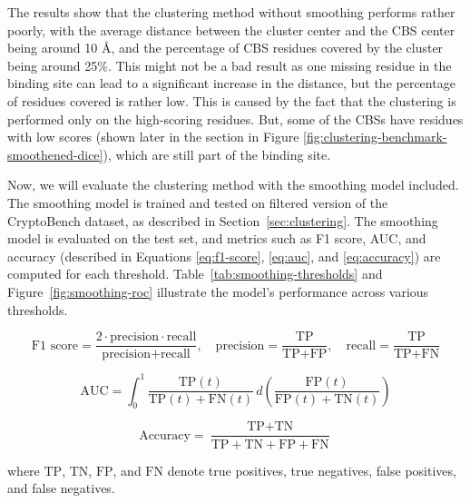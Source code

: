 The results show that the clustering method without smoothing performs rather poorly, with the average distance between the cluster center and the CBS center being around 10 \AA, and the percentage of CBS residues covered by the cluster being around 25\%. This might not be a bad result as one missing residue in the binding site can lead to a significant increase in the distance, but the percentage of residues covered is rather low. This is caused by the fact that the clustering is performed only on the high-scoring residues. But, some of the CBSs have residues with low scores (shown later in the section in Figure \ref{fig:clustering-benchmark-smoothened-dice}), which are still part of the binding site.

Now, we will evaluate the clustering method with the smoothing model included. The smoothing model is trained and tested on filtered version of the CryptoBench dataset, as described in Section~\ref{sec:clustering}. The smoothing model is evaluated on the test set, and metrics such as F1 score, AUC, and accuracy (described in Equations \ref{eq:f1-score}, \ref{eq:auc}, and \ref{eq:accuracy}) are computed for each threshold. Table~\ref{tab:smoothing-thresholds} and Figure~\ref{fig:smoothing-roc} illustrate the model's performance across various thresholds.

\begin{equation}
\text{F1 score} = \frac{2 \cdot \text{precision} \cdot \text{recall}}{\text{precision} + \text{recall}}, \quad
\text{precision} = \frac{\text{TP}}{\text{TP} + \text{FP}}, \quad
\text{recall} = \frac{\text{TP}}{\text{TP} + \text{FN}}
\label{eq:f1-score}
\end{equation}

\begin{equation}
\text{AUC} = \int_0^1 \frac{\text{TP}(t)}{\text{TP}(t) + \text{FN}(t)} \, d\left( \frac{\text{FP}(t)}{\text{FP}(t) + \text{TN}(t)} \right)
\label{eq:auc}
\end{equation}

\begin{equation}
\text{Accuracy} = \frac{\text{TP} + \text{TN}}{\text{TP} + \text{TN} + \text{FP} + \text{FN}}
\label{eq:accuracy}
\end{equation}

where $\text{TP}$, $\text{TN}$, $\text{FP}$, and $\text{FN}$ denote true positives, true negatives, false positives, and false negatives.

